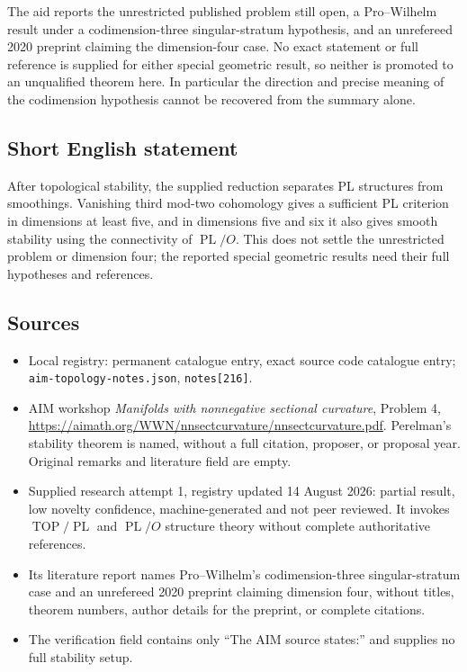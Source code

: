 \documentclass[11pt]{article}
\begin{document}
The aid reports the unrestricted published problem still open, a Pro--Wilhelm result under a codimension-three singular-stratum hypothesis, and an unrefereed 2020 preprint claiming the dimension-four case. No exact statement or full reference is supplied for either special geometric result, so neither is promoted to an unqualified theorem here. In particular the direction and precise meaning of the codimension hypothesis cannot be recovered from the summary alone.
\subsection{Short English statement}
After topological stability, the supplied reduction separates PL structures from smoothings. Vanishing third mod-two cohomology gives a sufficient PL criterion in dimensions at least five, and in dimensions five and six it also gives smooth stability using the connectivity of $\operatorname{PL}/O$. This does not settle the unrestricted problem or dimension four; the reported special geometric results need their full hypotheses and references.
\subsection{Sources}
\begin{itemize}
\item Local registry: permanent catalogue entry, exact source code catalogue entry; \texttt{aim-topology-notes.json}, \texttt{notes[216]}.
\item AIM workshop \emph{Manifolds with nonnegative sectional curvature}, Problem 4, \url{https://aimath.org/WWN/nnsectcurvature/nnsectcurvature.pdf}. Perelman's stability theorem is named, without a full citation, proposer, or proposal year. Original remarks and literature field are empty.
\item Supplied research attempt 1, registry updated 14 August 2026: partial result, low novelty confidence, machine-generated and not peer reviewed. It invokes $\operatorname{TOP}/\operatorname{PL}$ and $\operatorname{PL}/O$ structure theory without complete authoritative references.
\item Its literature report names Pro--Wilhelm's codimension-three singular-stratum case and an unrefereed 2020 preprint claiming dimension four, without titles, theorem numbers, author details for the preprint, or complete citations.
\item The verification field contains only ``The AIM source states:'' and supplies no full stability setup.
\end{itemize}
\end{document}
